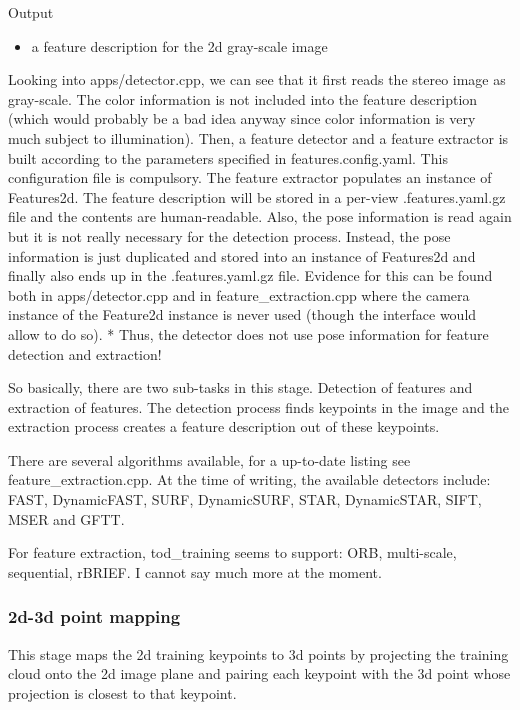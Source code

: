 Output
\begin{itemize}
    \item a feature description for the 2d gray-scale image
\end{itemize}


Looking into apps/detector.cpp, we can see that it first reads the stereo image
as gray-scale. The color information is not included into the feature
description (which would probably be a bad idea anyway since color information
is very much subject to illumination). Then, a feature detector and a feature
extractor is built according to the parameters specified in
features.config.yaml. This configuration file is compulsory. The feature
extractor populates an instance of Features2d. The feature description will be
stored in a per-view .features.yaml.gz file and the contents are
human-readable. Also, the pose information is read again but it is not really
necessary for the detection process. Instead, the pose information is just
duplicated and stored into an instance of Features2d and finally also ends up
in the .features.yaml.gz file. Evidence for this can be found both in
apps/detector.cpp and in feature\_extraction.cpp where the camera instance of
the Feature2d instance is never used (though the interface would allow to do
so). * Thus, the detector does not use pose information for feature detection
and extraction!

So basically, there are two sub-tasks in this stage. Detection of features and
extraction of features. The detection process finds keypoints in the image and
the extraction process creates a feature description out of these keypoints.

There are several algorithms available, for a up-to-date listing see
feature\_extraction.cpp. At the time of writing, the available detectors
include: FAST, DynamicFAST, SURF, DynamicSURF, STAR, DynamicSTAR, SIFT, MSER
and GFTT. %

For feature extraction, tod\_training seems to support: ORB, multi-scale,
sequential, rBRIEF. I cannot say much more at the moment. %

\subsubsection*{2d-3d point mapping}

This stage maps the 2d training keypoints to 3d points by projecting the
training cloud onto the 2d image plane and pairing each keypoint with the 3d
point whose projection is closest to that keypoint.

